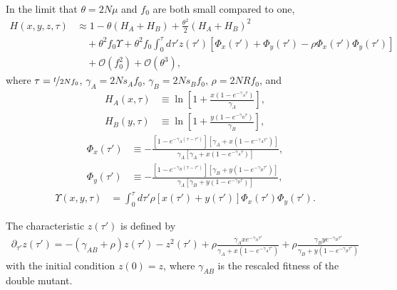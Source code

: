 \documentclass[11pt]{article}
\begin{document}
In the limit that $\theta = 2N\mu$ and $f_0$ are both small compared to one, 
\begin{align}\label{eq:h_expansion}
    H(x, y, z, \tau) &\approx 1 -\theta (H_A + H_B)
    + \frac{\theta^2}{2}\left(H_A + H_B\right)^2 \\\nonumber
    &\quad + \theta^2f_0\Upsilon + \theta^2f_0\int_0^{\tau}d \tau' z(\tau') \left[\Phi_x(\tau')+\Phi_y(\tau')-\rho\Phi_x(\tau')\Phi_y(\tau')\right] \\\nonumber
    &\quad + \mathcal{O}(f_0^2) +\mathcal{O}(\theta^3),
\end{align}
where $\tau = \nicefrac{t}{2Nf_0}$, $\gamma_A = 2Ns_Af_0$, $\gamma_B = 2Ns_Bf_0$, $\rho = 2NRf_0$, and 
\begin{subequations}\begin{align}
    H_A(x, \tau) &\equiv \ln \left[1 + \frac{x(1-e^{-\gamma_A\tau})}{\gamma_A}\right], \\
    H_B(y, \tau) &\equiv \ln \left[1 + \frac{y(1-e^{-\gamma_B\tau})}{\gamma_B}\right],
\end{align}\end{subequations}
\begin{subequations}\begin{align}
    \Phi_x(\tau') &\equiv -\frac{[ 1-e^{-\gamma_A (\tau-\tau')} ][\gamma_A+x(1-e^{-\gamma_A \tau'})]}{\gamma_A \left[ \gamma_A+x(1-e^{-\gamma_A \tau}) \right]}, \\
    \Phi_y(\tau') &\equiv -\frac{[1-e^{-\gamma_B (\tau-\tau')}][\gamma_B+y(1-e^{-\gamma_B \tau'})]}{\gamma_A \left[ \gamma_B+y(1-e^{-\gamma_B \tau}) \right]},
\end{align}\end{subequations}
\begin{align}
    \Upsilon(x, y, \tau) &= \int_0^{\tau} d\tau' \rho \left[x(\tau') + y(\tau')\right]\Phi_x(\tau')\Phi_y(\tau').
\end{align}

The characteristic $z(\tau')$ is defined by 
\begin{align}\label{eq:z_general_eq}
    \partial_{\tau'} z(\tau') = -(\gamma_{AB} + \rho) z(\tau') - z^2(\tau') + \rho \frac{\gamma_Axe^{-\gamma_A\tau'}}{\gamma_A+x(1-e^{-\gamma_A\tau'})} + \rho \frac{\gamma_Bye^{-\gamma_B\tau'}}{\gamma_B+y(1-e^{-\gamma_B\tau'})}
\end{align}
with the initial condition $z(0)=z$, where $\gamma_{AB}$ is the rescaled fitness of the double mutant.
\end{document}
